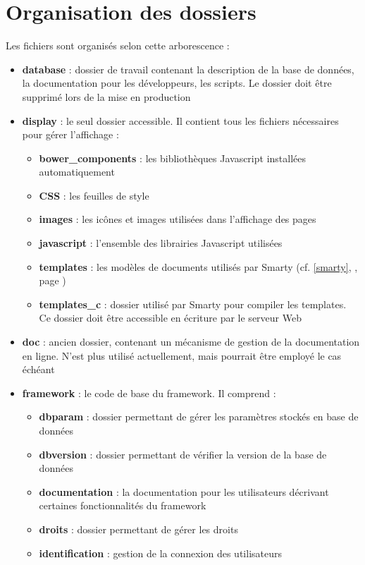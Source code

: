 \section{Organisation des dossiers}
Les fichiers sont organisés selon cette arborescence :
\begin{itemize}
\item \textbf{database} : dossier de travail contenant la description de la base de données, la documentation pour les développeurs, les scripts. Le dossier doit être supprimé lors de la mise en production
\item \textbf{display} : le seul dossier accessible. Il contient tous les fichiers nécessaires pour gérer l'affichage :
\begin{itemize}
\item \textbf{bower\_components} : les bibliothèques Javascript installées automatiquement
\item \textbf{CSS} : les feuilles de style
\item \textbf{images} : les icônes et images utilisées dans l'affichage des pages
\item \textbf{javascript} : l'ensemble des librairies Javascript utilisées
\item \textbf{templates} : les modèles de documents utilisés par Smarty (cf. \ref{smarty}, \textit{}, page \pageref{smarty})
\item \textbf{templates\_c} : dossier utilisé par Smarty pour compiler les templates. Ce dossier doit être accessible en écriture par le serveur Web
\end{itemize}
\item \textbf{doc} : ancien dossier, contenant un mécanisme de gestion de la documentation en ligne. N'est plus utilisé actuellement, mais pourrait être employé le cas échéant
\item \textbf{framework} : le code de base du framework. Il comprend :
\begin{itemize}
\item \textbf{dbparam} : dossier permettant de gérer les paramètres stockés en base de données
\item \textbf{dbversion} : dossier permettant de vérifier la version de la base de données
\item \textbf{documentation} : la documentation pour les utilisateurs décrivant certaines fonctionnalités du framework
\item \textbf{droits} : dossier permettant de gérer les droits 
\item \textbf{identification} : gestion de la connexion des utilisateurs

\end{itemize}
\end{itemize}
